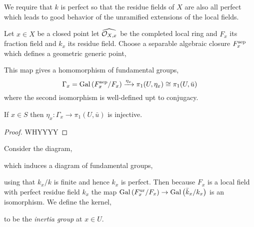 \documentclass[12pt]{article}
\begin{document}
\begin{rmk}
We require that $k$ is perfect so that the residue fields of $X$ are also all perfect which leads to good behavior of the unramified extensions of the local fields.
\end{rmk}

\begin{defn}
Let $x \in X$ be a closed point let $\widehat{\mathcal{O}_{X, x}}$ be the completed local ring and $F_x$ its fraction field and $k_x$ its residue field. Choose a separable algebraic closure $F_x^{\mathrm{sep}}$ which defines a geometric generic point,
\begin{center}
\end{center}
This map gives a homomorphism of fundamental groups,
\[ \Gamma_x = \mathrm{Gal}\left( F_x^{\mathrm{sep}} / F_x \right) \xrightarrow{\eta_x} \pi_1(U, \eta_x) \cong \pi_1(U, \bar{u}) \]
where the second isomorphism is well-defined upt to conjugacy. 
\end{defn}

\begin{prop}
If $x \in S$ then $\eta_x : \Gamma_x \to \pi_1(U, \bar{u})$ is injective.
\end{prop}

\begin{proof}
WHYYYY
\end{proof}

\begin{defn}
Consider the diagram,
\begin{center}
\end{center}
which induces a diagram of fundamental groups,
\begin{center}
\end{center}
using that $k_x / k$ is finite and hence $k_x$ is perfect. Then because $F_x$ is a local field with perfect residue field $k_x$ the map $\mathrm{Gal}\left( F_x^{\mathrm{ur}}/F_x \right) \to \mathrm{Gal}\left( \bar{k}_x / k_x \right)$ is an isomorphism. We define the kernel,
\begin{center}
\end{center} 
to be the \textit{inertia group} at $x \in U$. 
\end{defn}
\end{document}

